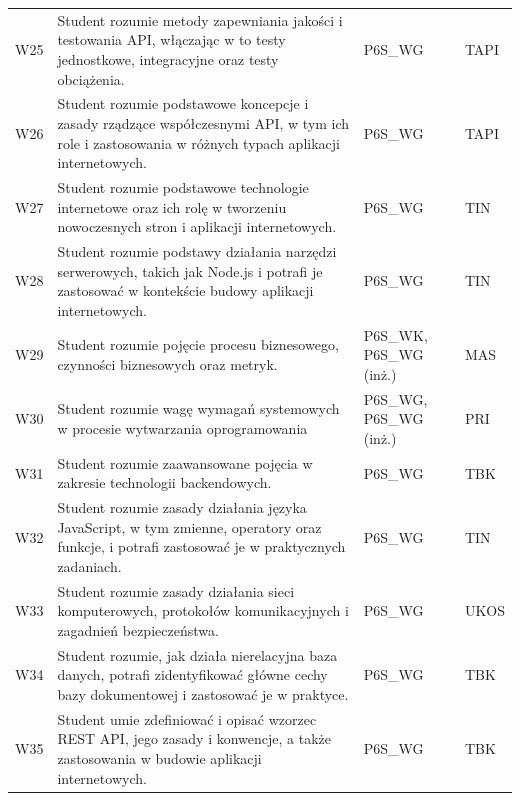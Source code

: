 \documentclass[12pt,a4paper]{article}
\begin{document}
{\begin{longtable}{m{1cm}m{8.8cm}m{2.1cm}m{2.5cm}}
\rowcolor{tableRowLight} W25 & Student rozumie metody zapewniania jakości i testowania API, włączając w to testy jednostkowe, integracyjne oraz testy obciążenia. & {\scriptsize P6S\_WG} & {\scriptsize TAPI} \\
\rowcolor{tableRowAlt} W26 & Student rozumie podstawowe koncepcje i zasady rządzące współczesnymi API, w tym ich role i zastosowania w różnych typach aplikacji internetowych. & {\scriptsize P6S\_WG} & {\scriptsize TAPI} \\
\rowcolor{tableRowLight} W27 & Student rozumie podstawowe technologie internetowe oraz ich rolę w tworzeniu nowoczesnych stron i aplikacji internetowych. & {\scriptsize P6S\_WG} & {\scriptsize TIN} \\
\rowcolor{tableRowAlt} W28 & Student rozumie podstawy działania narzędzi serwerowych, takich jak Node.js i potrafi je zastosować w kontekście budowy aplikacji internetowych. & {\scriptsize P6S\_WG} & {\scriptsize TIN} \\
\rowcolor{tableRowLight} W29 & Student rozumie pojęcie procesu biznesowego, czynności biznesowych oraz metryk. & {\scriptsize P6S\_WK, P6S\_WG {\scriptsize (inż.)}} & {\scriptsize MAS} \\
\rowcolor{tableRowAlt} W30 & Student rozumie wagę wymagań systemowych w procesie wytwarzania oprogramowania & {\scriptsize P6S\_WG, P6S\_WG {\scriptsize (inż.)}} & {\scriptsize PRI} \\
\rowcolor{tableRowLight} W31 & Student rozumie zaawansowane pojęcia w zakresie technologii backendowych. & {\scriptsize P6S\_WG} & {\scriptsize TBK} \\
\rowcolor{tableRowAlt} W32 & Student rozumie zasady działania języka JavaScript, w tym zmienne, operatory oraz funkcje, i potrafi zastosować je w praktycznych zadaniach. & {\scriptsize P6S\_WG} & {\scriptsize TIN} \\
\rowcolor{tableRowLight} W33 & Student rozumie zasady działania sieci komputerowych, protokołów komunikacyjnych i zagadnień bezpieczeństwa. & {\scriptsize P6S\_WG} & {\scriptsize UKOS} \\
\rowcolor{tableRowAlt} W34 & Student rozumie, jak działa nierelacyjna baza danych, potrafi zidentyfikować główne cechy bazy dokumentowej i zastosować je w praktyce. & {\scriptsize P6S\_WG} & {\scriptsize TBK} \\
\rowcolor{tableRowLight} W35 & Student umie zdefiniować i opisać wzorzec REST API, jego zasady i konwencje, a także zastosowania w budowie aplikacji internetowych. & {\scriptsize P6S\_WG} & {\scriptsize TBK} \\

\end{longtable}}
\end{document}

